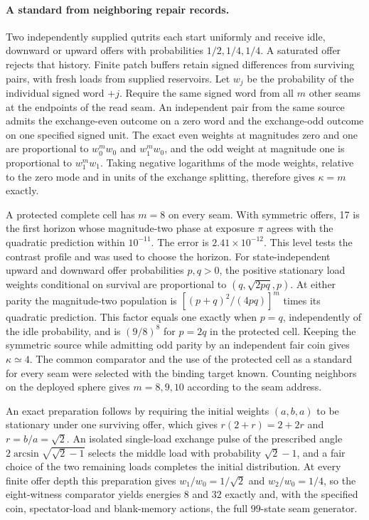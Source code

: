 \documentclass[11pt]{article}
\theoremstyle{definition}
\theoremstyle{remark}
\theoremstyle{plain}
\begin{document}
\paragraph{A standard from neighboring repair records.}
Two independently supplied qutrits each start uniformly and receive idle,
downward or upward offers with probabilities $1/2,1/4,1/4$. A saturated
offer rejects that history. Finite patch buffers retain signed differences
from surviving pairs, with fresh loads from supplied reservoirs.
Let $w_j$ be the probability of the individual signed word $+j$.
Require the same signed word from all $m$ other seams at the endpoints
of the read seam. An independent pair from the same source admits the
exchange-even outcome on a zero word and the exchange-odd outcome on
one specified signed unit. The exact even weights at magnitudes zero and one
are proportional to $w_0^m w_0$ and $w_1^m w_0$, and the odd weight at
magnitude one is proportional to $w_1^m w_1$. Taking negative logarithms
of the mode weights, relative to the zero mode and in units of the
exchange splitting, therefore gives $\kappa=m$ exactly.

A protected complete cell has $m=8$ on every seam. With symmetric offers,
17 is the first horizon whose magnitude-two phase at exposure $\pi$ agrees
with the quadratic prediction within $10^{-11}$. The error is
$2.41\times10^{-12}$. This level tests the contrast profile and was used
to choose the horizon. For state-independent upward and downward offer
probabilities $p,q>0$, the positive stationary load weights conditional
on survival are proportional to $(q,\sqrt{2pq},p)$. At either parity the
magnitude-two population is $[(p+q)^2/(4pq)]^m$ times its quadratic
prediction. This factor equals one exactly when $p=q$, independently of
the idle probability, and is $(9/8)^8$ for $p=2q$ in the protected cell.
Keeping the symmetric source while admitting odd parity by an independent fair coin gives
$\kappa\simeq4$. The common comparator and the use of the protected cell
as a standard for every seam were selected with the binding target known.
Counting neighbors on the deployed sphere gives
$m=8,9,10$ according to the seam address.

An exact preparation follows by requiring the initial weights $(a,b,a)$
to be stationary under one surviving offer, which gives
$r(2+r)=2+2r$ and $r=b/a=\sqrt2$.
An isolated single-load exchange pulse of the prescribed angle
$2\arcsin\sqrt{\sqrt2-1}$ selects the middle load with probability
$\sqrt2-1$, and a fair choice of the two remaining loads completes the
initial distribution. At every finite offer depth this preparation gives
$w_1/w_0=1/\sqrt2$ and $w_2/w_0=1/4$, so the eight-witness comparator
yields energies $8$ and $32$ exactly and, with the specified coin,
spectator-load and blank-memory actions, the full $99$-state seam generator.
\end{document}
